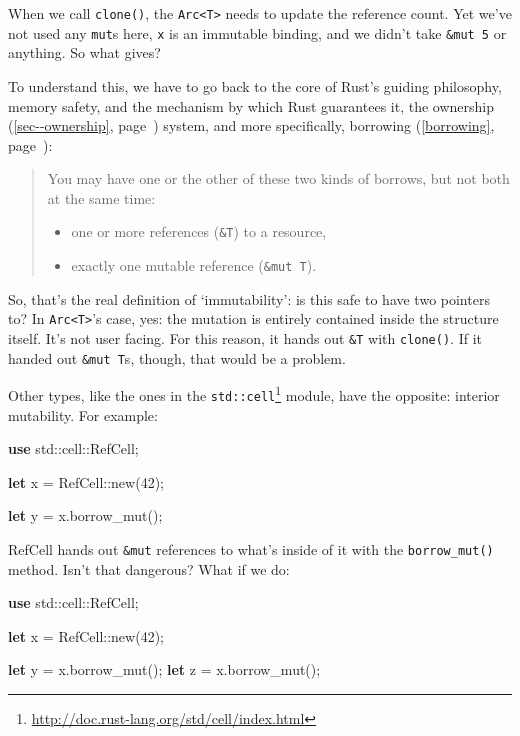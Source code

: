 \documentclass[a4paper,]{book}
\renewcommand*{\hyperref}[2][\ar]{%
  \def\ar{#2}%
  #2 (\autoref{#1}, page~\pageref{#1})}
\newenvironment{Shaded}{\begin{snugshade}}{\end{snugshade}}
\newcommand{\KeywordTok}[1]{\textcolor[rgb]{0.13,0.29,0.53}{\textbf{{#1}}}}
\newcommand{\DecValTok}[1]{\textcolor[rgb]{0.00,0.00,0.81}{{#1}}}
\newcommand{\NormalTok}[1]{{#1}}
\renewcommand{\href}[2]{#2\footnote{\url{#1}}}
\begin{document}
When we call \texttt{clone()}, the
\texttt{Arc\textless{}T\textgreater{}} needs to update the reference
count. Yet we've not used any \texttt{mut}s here, \texttt{x} is an
immutable binding, and we didn't take \texttt{\&mut\ 5} or anything. So
what gives?

To understand this, we have to go back to the core of Rust's guiding
philosophy, memory safety, and the mechanism by which Rust guarantees
it, the \hyperref[sec--ownership]{ownership} system, and more
specifically, \hyperref[borrowing]{borrowing}:

\begin{quote}
You may have one or the other of these two kinds of borrows, but not
both at the same time:

\begin{itemize}
\itemsep1pt\parskip0pt
\item
  one or more references (\texttt{\&T}) to a resource,
\item
  exactly one mutable reference (\texttt{\&mut\ T}).
\end{itemize}
\end{quote}

So, that's the real definition of `immutability': is this safe to have
two pointers to? In \texttt{Arc\textless{}T\textgreater{}}'s case, yes:
the mutation is entirely contained inside the structure itself. It's not
user facing. For this reason, it hands out \texttt{\&T} with
\texttt{clone()}. If it handed out \texttt{\&mut\ T}s, though, that
would be a problem.

Other types, like the ones in the
\href{http://doc.rust-lang.org/std/cell/index.html}{\texttt{std::cell}}
module, have the opposite: interior mutability. For example:

\begin{Shaded}
\begin{Highlighting}[]
\KeywordTok{use} \NormalTok{std::cell::RefCell;}

\KeywordTok{let} \NormalTok{x = RefCell::new(}\DecValTok{42}\NormalTok{);}

\KeywordTok{let} \NormalTok{y = x.borrow_mut();}
\end{Highlighting}
\end{Shaded}

RefCell hands out \texttt{\&mut} references to what's inside of it with
the \texttt{borrow\_mut()} method. Isn't that dangerous? What if we do:

\begin{Shaded}
\begin{Highlighting}[]
\KeywordTok{use} \NormalTok{std::cell::RefCell;}

\KeywordTok{let} \NormalTok{x = RefCell::new(}\DecValTok{42}\NormalTok{);}

\KeywordTok{let} \NormalTok{y = x.borrow_mut();}
\KeywordTok{let} \NormalTok{z = x.borrow_mut();}
\end{Highlighting}
\end{Shaded}
\end{document}
